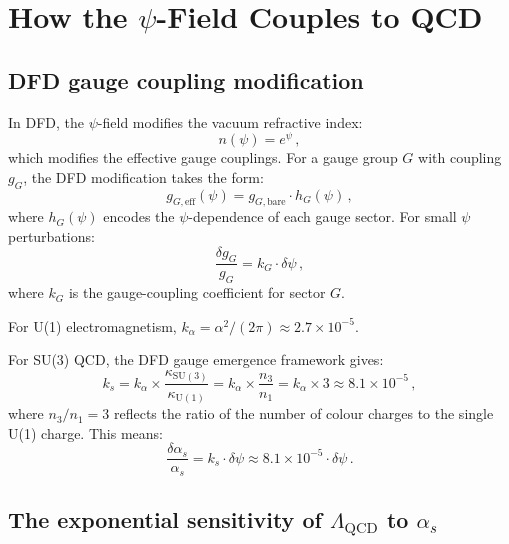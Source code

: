 \documentclass[aps,prd,twocolumn,superscriptaddress,floatfix,nofootinbib]{revtex4-2}
\newcommand{\kap}{\kappa}
\newcommand{\LQCD}{\Lambda_{\mathrm{QCD}}}
\newcommand{\as}{\alpha_s}
\begin{document}
\section{How the $\psi$-Field Couples to QCD}
\label{sec:psi_qcd_coupling}

\subsection{DFD gauge coupling modification}

In DFD, the $\psi$-field modifies the vacuum refractive index:
\begin{equation}
n(\psi) = e^\psi \, ,
\end{equation}
which modifies the effective gauge couplings. For a gauge group $G$ with
coupling $g_G$, the DFD modification takes the form:
\begin{equation}
g_{G,\mathrm{eff}}(\psi) = g_{G,\mathrm{bare}} \cdot h_G(\psi) \, ,
\end{equation}
where $h_G(\psi)$ encodes the $\psi$-dependence of each gauge sector. For small
$\psi$ perturbations:
\begin{equation}
\frac{\delta g_G}{g_G} = k_G \cdot \delta\psi \, ,
\label{eq:gauge_shift}
\end{equation}
where $k_G$ is the gauge-coupling coefficient for sector $G$.

For U(1) electromagnetism, $k_\alpha = \alpha^2/(2\pi) \approx 2.7 \times
10^{-5}$.

For SU(3) QCD, the DFD gauge emergence framework gives:
\begin{equation}
k_s = k_\alpha \times \frac{\kap_{\mathrm{SU}(3)}}{\kap_{\mathrm{U}(1)}} =
k_\alpha \times \frac{n_3}{n_1} = k_\alpha \times 3 \approx 8.1 \times 10^{-5}
\, ,
\label{eq:ks}
\end{equation}
where $n_3/n_1 = 3$ reflects the ratio of the number of colour charges to the
single U(1) charge. This means:
\begin{equation}
\frac{\delta\as}{\as} = k_s \cdot \delta\psi \approx 8.1 \times 10^{-5} \cdot
\delta\psi \, .
\label{eq:alpha_s_shift}
\end{equation}

\subsection{The exponential sensitivity of $\LQCD$ to $\as$}
\end{document}
